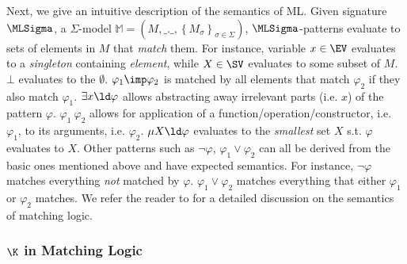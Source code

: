 Next, we give an intuitive description of the semantics of ML.
Given signature $\MLSigma$, a $\Sigma$-model
$\mathbb{M} = \left(M,\_.\_,\left\{M_{\sigma}\right\}_{\sigma \in \Sigma}\right)$,
$\MLSigma$-patterns evaluate to sets of elements in $M$ that \emph{match} them.
For instance, variable $x \in \EV$ evaluates to a \emph{singleton}
containing \emph{element}, while $X \in \SV$ evaluates to some subset of $M$. $\bot$
evaluates to the $\emptyset$.
$\varphi_1 \imp \varphi_2$ is matched by all elements that match $\varphi_2$
if they also match $\varphi_1$. $\exists x \ld \varphi$ allows abstracting
away irrelevant parts (i.e. $x$) of the pattern $\varphi$. $\varphi_1\
\varphi_2$ allows for application of a function/operation/constructor,
i.e. $\varphi_1$, to its arguments, i.e. $\varphi_2$. $\mu X \ld \varphi$
evaluates to the \emph{smallest} set $X$ s.t. $\varphi$ evaluates to $X$.
Other patterns such as $\neg \varphi$, $\varphi_1 \vee \varphi_2$ can all be
derived from the basic ones mentioned above and have expected semantics.
For instance, $\neg \varphi$ matches everything \emph{not} matched by
$\varphi$. $\varphi_1 \vee \varphi_2$ matches everything that either
$\varphi_1$ or $\varphi_2$ matches. We refer the reader to \cite{ChenTR20}
for a detailed discussion on the semantics of matching logic.

\subsubsection{$\K$ in Matching Logic}

